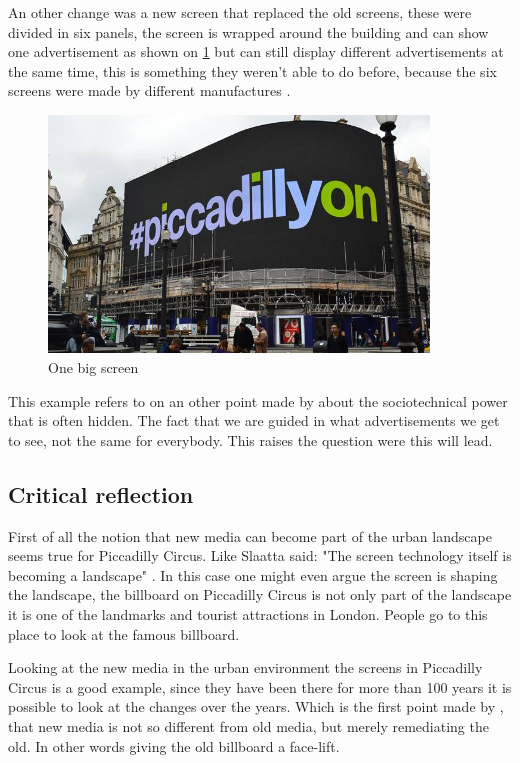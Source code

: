 \documentclass[a4paper, 11pt]{article}
\begin{document}
An other change was a new screen that replaced the old screens, these were divided in six panels, the screen is wrapped around the building and can show one advertisement as shown on \ref{fig:graph3} but can still display different advertisements at the same time, this is something they weren't able to do before, because the six screens were made by different manufactures \citep{wired}.

\begin{figure}[h!]
    \centering
    \includegraphics[width=0.9\textwidth]{on.png}
    \caption{One big screen \citep{wired}}
    \label{fig:graph3}
\end{figure}

This example refers to on an other point made by \cite{Graham} about the sociotechnical power that is often hidden. The fact that we are guided in what advertisements we get to see, not the same for everybody. This raises the question were this will lead.



\subsection{Critical reflection}

First of all the notion that new media can become part of the urban landscape seems true for Piccadilly Circus. Like Slaatta said: "The screen technology itself is becoming a landscape" \citep{Slaatta2006}. In this case one might even argue the screen is shaping the landscape, the billboard on Piccadilly Circus is not only part of the landscape it is one of the landmarks and tourist attractions in London. People go to this place to look at the famous billboard. 

Looking at the new media in the urban environment the screens in Piccadilly Circus is a good example, since they have been there for more than 100 years it is possible to look at the changes over the years. Which is the first point made by \cite{Graham}, that new media is not so different from old media, but merely remediating the old. In other words giving the old billboard a face-lift. 
\end{document}
